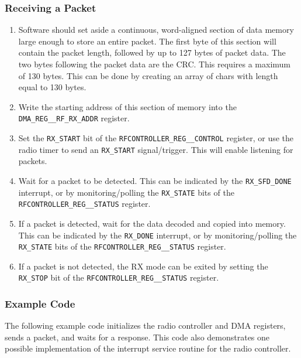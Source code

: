 \subsubsection{Receiving a Packet}

\begin{enumerate}
	\item Software should set aside a continuous, word-aligned section of data memory large enough to store an entire packet. The first byte of this section will contain the packet length, followed by up to 127 bytes of packet data. The two bytes following the packet data are the CRC. This requires a maximum of 130 bytes. This can be done by creating an array of chars with length equal to 130 bytes.
	\item Write the starting address of this section of memory into the \texttt{DMA\_REG\_\_RF\-\_RX\_ADDR} register.
	\item Set the \texttt{RX\_START} bit of the \texttt{RFCONTROLLER\_REG\_\_CONTROL} register, or use the radio timer to send an \texttt{RX\_START} signal/trigger. This will enable listening for packets.
	\item Wait for a packet to be detected. This can be indicated by the \texttt{RX\_SFD\_DONE} interrupt, or by monitoring/polling the \texttt{RX\_STATE} bits of the \texttt{RFCONTROLLER\_REG\-\_\_STATUS} register.
	\item If a packet is detected, wait for the data decoded and copied into memory. This can be indicated by the \texttt{RX\_DONE} interrupt, or by monitoring/polling the \texttt{RX\_STATE} bits of the \texttt{RFCONTROLLER\_REG\_\_STATUS} register.
	\item If a packet is not detected, the RX mode can be exited by setting the \texttt{RX\_STOP} bit of the \texttt{RFCONTROLLER\_REG\_\_STATUS} register.
\end{enumerate}

\subsubsection{Example Code}
The following example code initializes the radio controller and DMA registers, sends a packet, and waits for a response. This code also demonstrates one possible implementation of the interrupt service routine for the radio controller.

